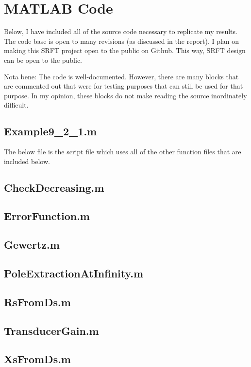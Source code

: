 \section{MATLAB\textsuperscript{\textregistered} Code}
\label{sec:appendix_a_matlabtextregistered}

Below, I have included all of the source code necessary to replicate my results.
The code base is open to many revisions (as discussed in the report). I plan on
making this SRFT project open to the public on Github. This way, SRFT design can
be open to the public.

Nota bene: The code is well-documented. However, there are many blocks that are
commented out that were for testing purposes that can still be used for that
purpose. In my opinion, these blocks do not make reading the source inordinately
difficult.

\subsection{Example9\_2\_1.m}
The below file is the script file which uses all of the other function files
that are included below.



\subsection{CheckDecreasing.m}


\subsection{ErrorFunction.m}


\subsection{Gewertz.m}


\subsection{PoleExtractionAtInfinity.m}


\subsection{RsFromDs.m}


\subsection{TransducerGain.m}


\subsection{XsFromDs.m}

